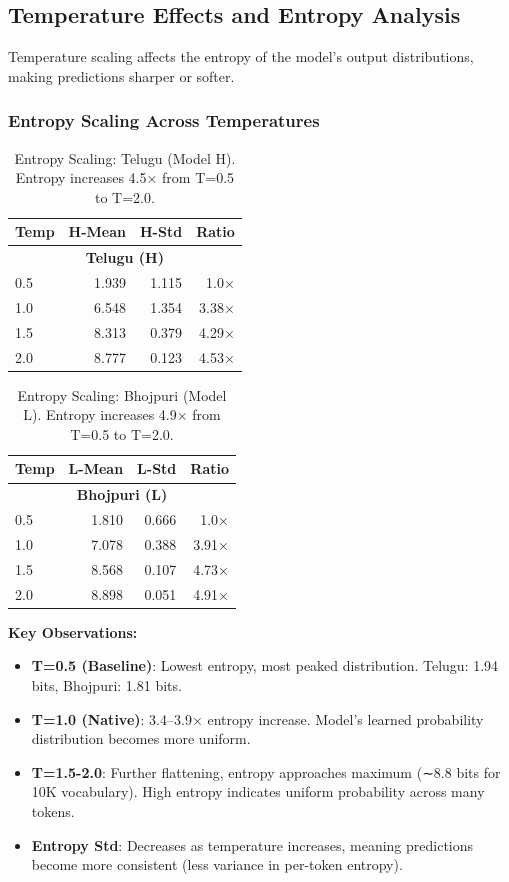 \documentclass[11pt,a4paper]{article}
\begin{document}
\subsection{Temperature Effects and Entropy Analysis}

Temperature scaling affects the entropy of the model's output distributions, making predictions sharper or softer.

\subsubsection{Entropy Scaling Across Temperatures}

\begin{table}[H]
\centering
\begin{tabular}{lrrr}
\toprule
\textbf{Temp} & \textbf{H-Mean} & \textbf{H-Std} & \textbf{Ratio} \\
\midrule
\multicolumn{4}{c}{\textbf{Telugu (H)}} \\
\midrule
0.5 & 1.939 & 1.115 & 1.0× \\
1.0 & 6.548 & 1.354 & 3.38× \\
1.5 & 8.313 & 0.379 & 4.29× \\
2.0 & 8.777 & 0.123 & 4.53× \\
\bottomrule
\end{tabular}
\caption{Entropy Scaling: Telugu (Model H). Entropy increases 4.5× from T=0.5 to T=2.0.}
\label{table:entropy_telugu}
\end{table}

\begin{table}[H]
\centering
\begin{tabular}{lrrr}
\toprule
\textbf{Temp} & \textbf{L-Mean} & \textbf{L-Std} & \textbf{Ratio} \\
\midrule
\multicolumn{4}{c}{\textbf{Bhojpuri (L)}} \\
\midrule
0.5 & 1.810 & 0.666 & 1.0× \\
1.0 & 7.078 & 0.388 & 3.91× \\
1.5 & 8.568 & 0.107 & 4.73× \\
2.0 & 8.898 & 0.051 & 4.91× \\
\bottomrule
\end{tabular}
\caption{Entropy Scaling: Bhojpuri (Model L). Entropy increases 4.9× from T=0.5 to T=2.0.}
\label{table:entropy_bhojpuri}
\end{table}

\textbf{Key Observations:}
\begin{itemize}
    \item \textbf{T=0.5 (Baseline)}: Lowest entropy, most peaked distribution. Telugu: 1.94 bits, Bhojpuri: 1.81 bits.
    \item \textbf{T=1.0 (Native)}: 3.4–3.9× entropy increase. Model's learned probability distribution becomes more uniform.
    \item \textbf{T=1.5-2.0}: Further flattening, entropy approaches maximum (∼8.8 bits for 10K vocabulary). High entropy indicates uniform probability across many tokens.
    \item \textbf{Entropy Std}: Decreases as temperature increases, meaning predictions become more consistent (less variance in per-token entropy).
\end{itemize}
\end{document}
